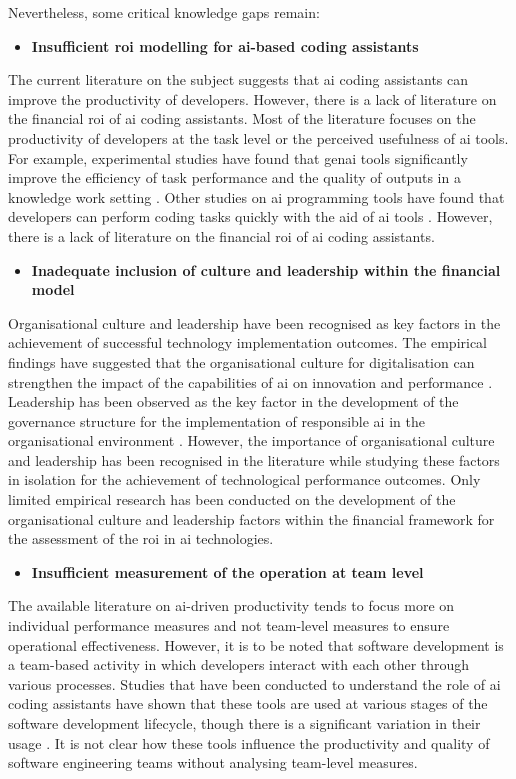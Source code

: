 Nevertheless, some critical knowledge gaps remain:
\begin{itemize}
	\item \textbf{Insufficient \gls{roi} modelling for \gls{ai}-based coding assistants} 
\end{itemize}
The current literature on the subject suggests that \gls{ai} coding assistants can improve the productivity of developers. However, there is a lack of literature on the financial \gls{roi} of \gls{ai} coding assistants. Most of the literature focuses on the productivity of developers at the task level or the perceived usefulness of \gls{ai} tools. For example, experimental studies have found that \gls{genai} tools significantly improve the efficiency of task performance and the quality of outputs in a knowledge work setting \autocite{Noy2023}. Other studies on \gls{ai} programming tools have found that developers can perform coding tasks quickly with the aid of \gls{ai} tools \autocite{Peng2023}. However, there is a lack of literature on the financial \gls{roi} of \gls{ai} coding assistants.

\begin{itemize}
	\item \textbf{Inadequate inclusion of culture and leadership within the financial model} 
\end{itemize}
Organisational culture and leadership have been recognised as key factors in the achievement of successful technology implementation outcomes. The empirical findings have suggested that the organisational culture for digitalisation can strengthen the impact of the capabilities of \gls{ai} on innovation and performance \autocite{An2024}. Leadership has been observed as the key factor in the development of the governance structure for the implementation of responsible \gls{ai} in the organisational environment \autocite{Schneider2023}. However, the importance of organisational culture and leadership has been recognised in the literature while studying these factors in isolation for the achievement of technological performance outcomes. Only limited empirical research has been conducted on the development of the organisational culture and leadership factors within the financial framework for the assessment of the \gls{roi} in \gls{ai} technologies.

\begin{itemize}
	\item \textbf{Insufficient measurement of the operation at team level} 
\end{itemize}
The available literature on \gls{ai}-driven productivity tends to focus more on individual performance measures and not team-level measures to ensure operational effectiveness. However, it is to be noted that software development is a team-based activity in which developers interact with each other through various processes. Studies that have been conducted to understand the role of \gls{ai} coding assistants have shown that these tools are used at various stages of the software development lifecycle, though there is a significant variation in their usage \autocite{Sergeyuk2025}. It is not clear how these tools influence the productivity and quality of software engineering teams without analysing team-level measures.

